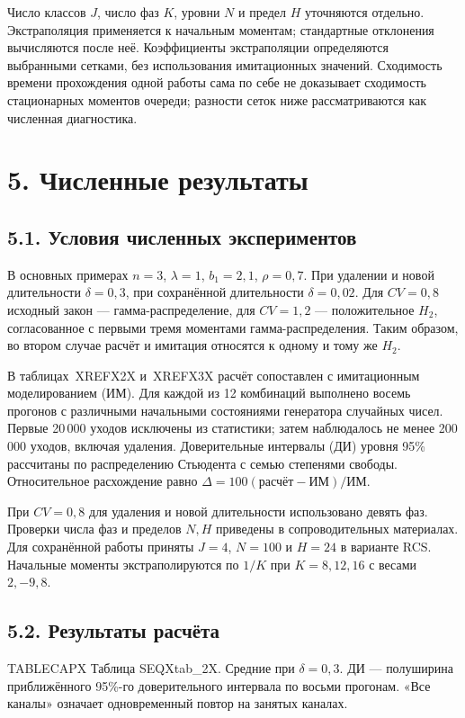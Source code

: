 Число классов \(J\), число фаз \(K\), уровни \(N\) и предел \(H\) уточняются отдельно. Экстраполяция применяется к начальным моментам; стандартные отклонения вычисляются после неё. Коэффициенты экстраполяции определяются выбранными сетками, без использования имитационных значений. Сходимость времени прохождения одной работы сама по себе не доказывает сходимость стационарных моментов очереди; разности сеток ниже рассматриваются как численная диагностика.

\section*{5. Численные результаты}
\subsection*{5.1. Условия численных экспериментов}
В основных примерах \(n=3\), \(\lambda=1\), \(b_1=2{,}1\), \(\rho=0{,}7\). При удалении и новой длительности \(\delta=0{,}3\), при сохранённой длительности \(\delta=0{,}02\). Для \(CV=0{,}8\) исходный закон --- гамма-распределение, для \(CV=1{,}2\) --- положительное \(H_2\), согласованное с первыми тремя моментами гамма-распределения. Таким образом, во втором случае расчёт и имитация относятся к одному и тому же \(H_2\).

В таблицах~XREFX2X и~XREFX3X расчёт сопоставлен с имитационным моделированием (ИМ). Для каждой из 12 комбинаций выполнено восемь прогонов с различными начальными состояниями генератора случайных чисел. Первые 20\,000 уходов исключены из статистики; затем наблюдалось не менее 200\,000 уходов, включая удаления. Доверительные интервалы (ДИ) уровня 95\% рассчитаны по распределению Стьюдента с семью степенями свободы. Относительное расхождение равно \(\Delta=100(\text{расчёт}-\text{ИМ})/\text{ИМ}\).

При \(CV=0{,}8\) для удаления и новой длительности использовано девять фаз. Проверки числа фаз и пределов \(N,H\) приведены в сопроводительных материалах. Для сохранённой работы приняты \(J=4\), \(N=100\) и \(H=24\) в варианте RCS. Начальные моменты экстраполируются по \(1/K\) при \(K=8,12,16\) с весами \(2,-9,8\).

\subsection*{5.2. Результаты расчёта}
\noindent TABLECAPX Таблица SEQXtab_2X. Средние при $\delta=0{,}3$. ДИ --- полуширина приближённого 95\%-го доверительного интервала по восьми прогонам. «Все каналы» означает одновременный повтор на занятых каналах.\par


